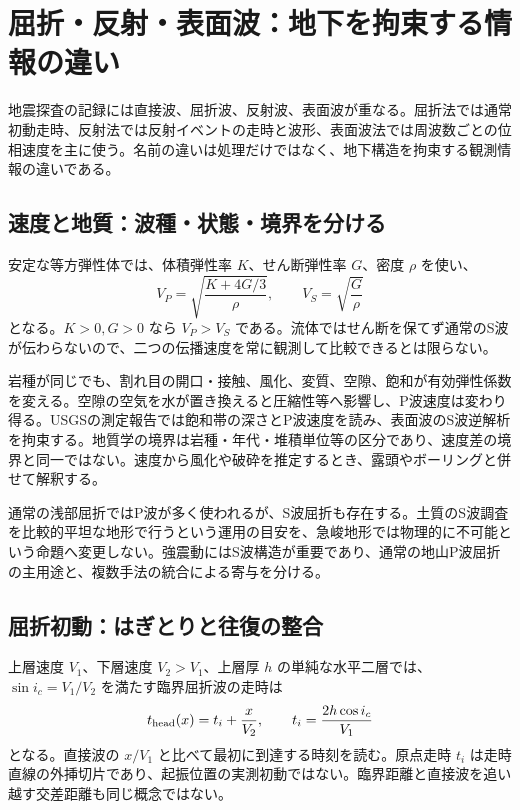 \section{屈折・反射・表面波：地下を拘束する情報の違い}
\label{theory:exploration:seismic}
地震探査の記録には直接波、屈折波、反射波、表面波が重なる。屈折法では通常初動走時、反射法では反射イベントの走時と波形、表面波法では周波数ごとの位相速度を主に使う。名前の違いは処理だけではなく、地下構造を拘束する観測情報の違いである。

\subsection{速度と地質：波種・状態・境界を分ける}
\label{theory:exploration:waveproperties}
安定な等方弾性体では、体積弾性率 \(K\)、せん断弾性率 \(G\)、密度 \(\rho\) を使い、
\[
 V_P=\sqrt{\frac{K+4G/3}{\rho}},\qquad
 V_S=\sqrt{\frac{G}{\rho}}
\]
となる。\(K>0,G>0\) なら \(V_P>V_S\) である。流体ではせん断を保てず通常のS波が伝わらないので、二つの伝播速度を常に観測して比較できるとは限らない。

岩種が同じでも、割れ目の開口・接触、風化、変質、空隙、飽和が有効弾性係数を変える。空隙の空気を水が置き換えると圧縮性等へ影響し、P波速度は変わり得る。USGSの測定報告では飽和帯の深さとP波速度を読み、表面波のS波逆解析を拘束する\cite{usgs_refraction2013}。地質学の境界は岩種・年代・堆積単位等の区分であり、速度差の境界と同一ではない。速度から風化や破砕を推定するとき、露頭やボーリングと併せて解釈する。

通常の浅部屈折ではP波が多く使われるが、S波屈折も存在する\cite{epa_seismic_refraction}。土質のS波調査を比較的平坦な地形で行うという運用の目安を、急峻地形では物理的に不可能という命題へ変更しない。強震動にはS波構造が重要であり、通常の地山P波屈折の主用途と、複数手法の統合による寄与を分ける\cite{segj_integrated2017,japansea_spac2017}。

\subsection{屈折初動：はぎとりと往復の整合}
\label{theory:exploration:refraction}
上層速度 \(V_1\)、下層速度 \(V_2>V_1\)、上層厚 \(h\) の単純な水平二層では、\(\sin i_c=V_1/V_2\) を満たす臨界屈折波の走時は
\[
 t_{\rm head}(x)=t_i+\frac{x}{V_2},\qquad
 t_i=\frac{2h\cos i_c}{V_1}
\]
となる。直接波の \(x/V_1\) と比べて最初に到達する時刻を読む。原点走時 \(t_i\) は走時直線の外挿切片であり、起振位置の実測初動ではない。臨界距離と直接波を追い越す交差距離も同じ概念ではない\cite{epa_seismic_refraction}。

